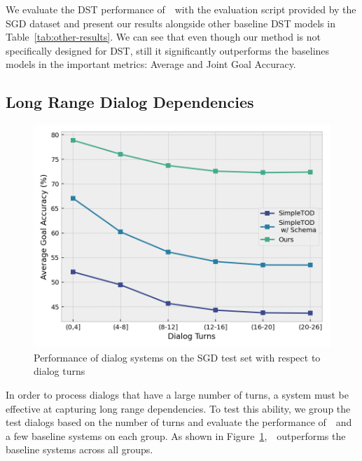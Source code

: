 We evaluate the DST performance of~\oursys~with the evaluation script provided by the SGD dataset and present our results alongside
other baseline DST models in Table~\ref{tab:other-results}.
We can see that even though our method is not specifically designed for DST, still it significantly outperforms the baselines models in the
important metrics: Average and Joint Goal Accuracy.

\subsection{Long Range Dialog Dependencies}

\begin{figure}[t]
    \centering
    \includegraphics[width=\linewidth]{assets/dialog_turns.png}
    \caption{
        Performance of dialog systems on the SGD test set with respect to dialog turns
    }
    \label{fig:dialog_turns}
\end{figure}

In order to process dialogs that have a large number of turns, a system must be effective at capturing long range dependencies.
To test this ability, we group the test dialogs based on the number of turns and evaluate the performance of~\oursys~and a few baseline systems on each group.
As shown in Figure~\ref{fig:dialog_turns},~\oursys~outperforms the baseline systems across all groups.

